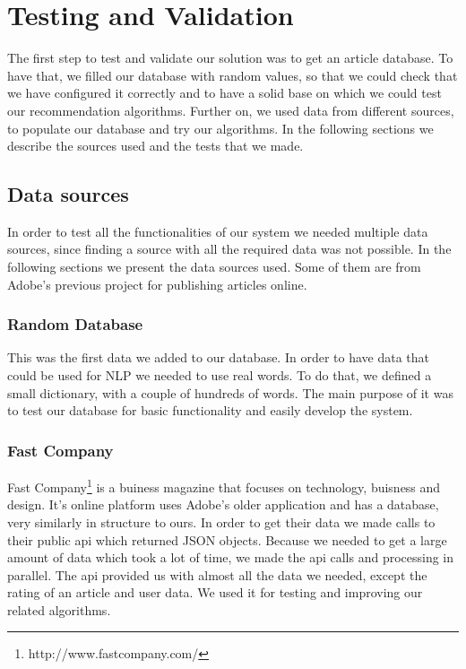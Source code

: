 \chapter{Testing and Validation}
\label{chapter:testing-validation}

The first step to test and validate our solution was to get an article database. To have that, we filled our database with random values, so that we could check that we have configured it correctly and to have a solid base on which we could test our recommendation algorithms.
Further on, we used data from different sources, to populate our database and try our algorithms.
In the following sections we describe the sources used and the tests that we made.

\section{Data sources} 
\label{sec:testing-and-validation-data-sources}
In order to test all the functionalities of our system we needed multiple data sources, since finding a source with all the required data was not possible.
In the following sections we present the data sources used. Some of them are from Adobe's previous project for publishing articles online.

\subsection{Random Database} 
\label{sec:testing-and-validation-data-sources-random-database}
This was the first data we added to our database.
In order to have data that could be used for NLP we needed to use real words. To do that, we defined a small dictionary, with a couple of hundreds of words.
The main purpose of it was to test our database for basic functionality and easily develop the system.

\subsection{Fast Company} 
\label{sec:testing-and-validation-data-sources-fast-company}
Fast Company\footnote{http://www.fastcompany.com/} is a buiness magazine that focuses on technology, buisness and design. It's online platform uses Adobe's older application and has a database, very similarly in structure to ours.
In order to get their data we made calls to their public api which returned JSON objects. Because we needed to get a large amount of data which took a lot of time, we made the api calls and processing in parallel. The api provided us with almost all the data we needed, except the rating of an article and user data. We used it for testing and improving our related algorithms.

